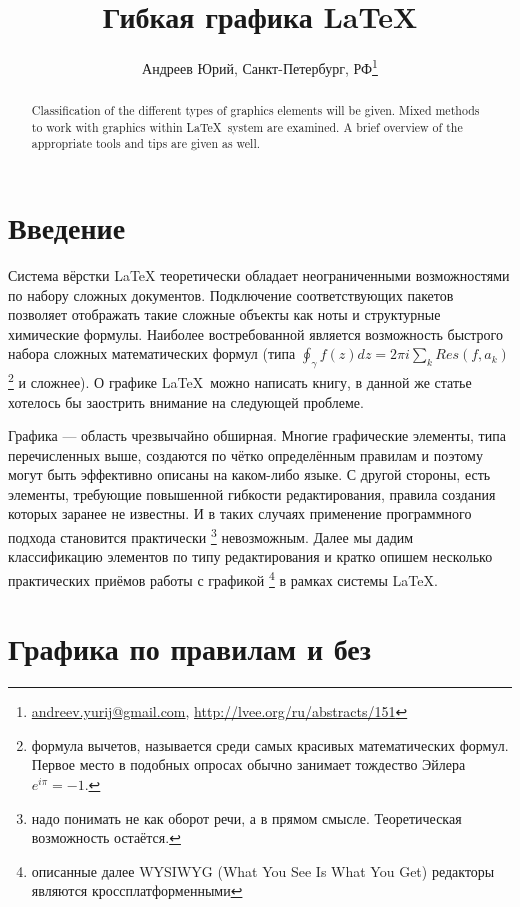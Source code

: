 \documentclass[10pt, a5paper]{article}
\begin{document}
\title{Гибкая графика \LaTeX}
\author{Андреев Юрий, Санкт-Петербург, РФ\footnote{\url{andreev.yurij@gmail.com}, \url{http://lvee.org/ru/abstracts/151}}}
\maketitle
\begin{abstract}
Classification of the different types of graphics elements will be given. 
Mixed methods to work with graphics within \LaTeX \, system are examined.
A brief overview of the appropriate tools and tips are given as well.
\end{abstract}        

\section*{Введение}

Система вёрстки \LaTeX \cite{RG1} теоретически обладает неограниченными возможностями по 
набору сложных документов. Подключение соответствующих пакетов позволяет отображать такие 
сложные объекты как ноты и структурные химические формулы.   
Наиболее востребованной является возможность быстрого набора 
сложных математических формул 
(типа $\displaystyle{\oint_{\gamma} f(z)dz = 2\pi i \sum_k Res(f, a_k)}$ 
\footnote{формула вычетов, называется среди самых красивых математических формул. 
Первое место в подобных опросах обычно занимает тождество Эйлера $e^{i\pi}=-1$.}
и сложнее).
О графике \LaTeX \, можно написать книгу\cite{RG2}, в данной же статье хотелось бы заострить внимание на следующей проблеме.

Графика --- область чрезвычайно обширная. 
Многие графические элементы, типа перечисленных выше, создаются по чётко определённым правилам и поэтому 
могут быть эффективно описаны на каком-либо языке.
С другой стороны, есть элементы, требующие повышенной гибкости редактирования,
правила создания которых заранее не известны.
И в таких случаях применение программного подхода становится практически
\footnote{надо понимать не как оборот речи, а в прямом смысле. Теоретическая возможность остаётся.}
невозможным. 
Далее мы дадим классификацию элементов по типу редактирования 
и кратко опишем несколько практических приёмов работы с графикой
\footnote{описанные далее WYSIWYG (What You See Is What You Get) редакторы являются кроссплатформенными}
в рамках системы \LaTeX.

\section*{Графика по правилам и без}
\end{document}
